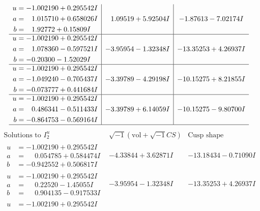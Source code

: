 \documentclass[1p]{elsarticle_modified}
\theoremstyle{definition}
\newcommand{\I}{\sqrt{-1}}
\begin{document}
$$\begin{array}{c|c|c}
\begin{aligned}
u &= -1.002190 + 0.295542 I \\
a &= \phantom{-}1.015710 + 0.658026 I \\
b &= \phantom{-}1.92772 + 0.15809 I\end{aligned}
 & \phantom{-}1.09519 + 5.92504 I & -1.87613 - 7.02174 I \\ \hline\begin{aligned}
u &= -1.002190 + 0.295542 I \\
a &= \phantom{-}1.078360 - 0.597521 I \\
b &= -0.20300 - 1.52029 I\end{aligned}
 & -3.95954 - 1.32348 I & -13.35253 + 4.26937 I \\ \hline\begin{aligned}
u &= -1.002190 + 0.295542 I \\
a &= -1.049240 - 0.705437 I \\
b &= -0.073777 + 0.441684 I\end{aligned}
 & -3.39789 - 4.29198 I & -10.15275 + 8.21855 I \\ \hline\begin{aligned}
u &= -1.002190 + 0.295542 I \\
a &= \phantom{-}0.486341 - 0.511433 I \\
b &= -0.864753 - 0.569164 I\end{aligned}
 & -3.39789 + 6.14059 I & -10.15275 - 9.80700 I\\
 \hline 
 \end{array}$$\newpage$$\begin{array}{c|c|c}  
\text{Solutions to }I^u_{2}& \I (\text{vol} + \sqrt{-1}CS) & \text{Cusp shape}\\
 \hline 
\begin{aligned}
u &= -1.002190 + 0.295542 I \\
a &= \phantom{-}0.054785 + 0.584474 I \\
b &= -0.942552 + 0.506817 I\end{aligned}
 & -4.33844 + 3.62871 I & -13.18434 - 0.71090 I \\ \hline\begin{aligned}
u &= -1.002190 + 0.295542 I \\
a &= \phantom{-}0.22520 - 1.45055 I \\
b &= \phantom{-}0.904135 - 0.917533 I\end{aligned}
 & -3.95954 - 1.32348 I & -13.35253 + 4.26937 I \\ \hline\begin{aligned}
u &= -1.002190 + 0.295542 I \\

\end{aligned}
\end{array}$$
\end{document}
